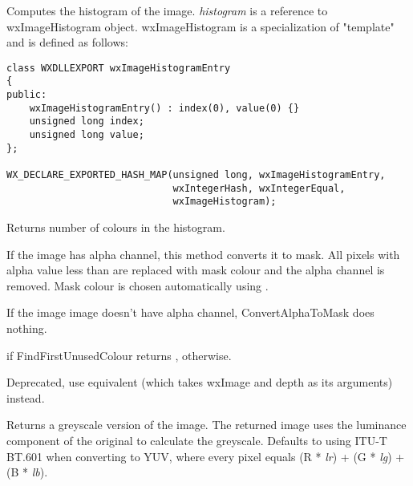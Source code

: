 Computes the histogram of the image. {\it histogram} is a reference to
wxImageHistogram object. wxImageHistogram is a specialization of
 "template" and is defined as follows:

\begin{verbatim}
class WXDLLEXPORT wxImageHistogramEntry
{
public:
    wxImageHistogramEntry() : index(0), value(0) {}
    unsigned long index;
    unsigned long value;
};

WX_DECLARE_EXPORTED_HASH_MAP(unsigned long, wxImageHistogramEntry,
                             wxIntegerHash, wxIntegerEqual,
                             wxImageHistogram);
\end{verbatim}


Returns number of colours in the histogram.


\label{wximageconvertalphatomask}


If the image has alpha channel, this method converts it to mask. All pixels
with alpha value less than  are replaced with mask colour
and the alpha channel is removed. Mask colour is chosen automatically using
.

If the image image doesn't have alpha channel,
ConvertAlphaToMask does nothing.


\false if FindFirstUnusedColour returns \false, \true otherwise.


\label{wximageconverttobitmap}


Deprecated, use equivalent 
(which takes wxImage and depth as its arguments) instead.


\label{wximageconverttogreyscale}


Returns a greyscale version of the image. The returned image uses the luminance
component of the original to calculate the greyscale. Defaults to using
ITU-T BT.601 when converting to YUV, where every pixel equals
(R * {\it lr}) + (G * {\it lg}) + (B * {\it lb}).


